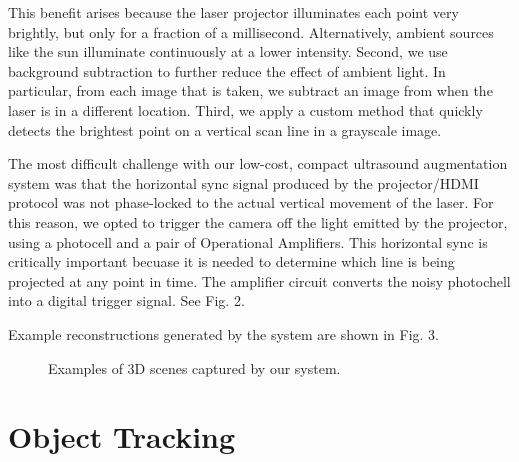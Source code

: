 \documentclass{llncs}
\begin{document}
This benefit arises because the laser projector illuminates each point very brightly, but only for a fraction of a millisecond. Alternatively, ambient sources like the sun illuminate continuously at a lower intensity. Second, we use background subtraction to further reduce the effect of ambient light. In particular, from each image that is taken, we subtract an image from when the laser is in a different location.  Third, we apply a custom method that quickly detects the brightest point on a vertical scan line in a grayscale image.

The most difficult challenge with our low-cost, compact ultrasound augmentation system was that the horizontal sync signal produced by the projector/HDMI protocol was not phase-locked to the actual vertical movement of the laser. For this reason, we opted to trigger the camera off the light emitted by the projector, using a photocell and a pair of Operational Amplifiers.  
This horizontal sync is critically important becuase it is needed to determine which line is being projected at any point in time.  The amplifier circuit converts the noisy photochell into a digital trigger signal.  See Fig. 2.

Example reconstructions generated by the system are shown in Fig. 3.

\begin{figure}[h]
\centering
{}\hfill%
\caption{
Examples of 3D scenes captured by our system.
}
\end{figure}

\section{Object Tracking}
\end{document}
